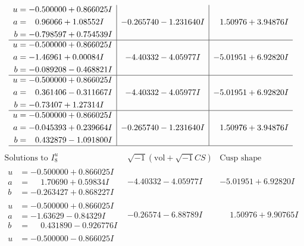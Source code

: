 \documentclass[1p]{elsarticle_modified}
\theoremstyle{definition}
\newcommand{\I}{\sqrt{-1}}
\begin{document}
$$\begin{array}{c|c|c}
\begin{aligned}
u &= -0.500000 + 0.866025 I \\
a &= \phantom{-}0.96066 + 1.08552 I \\
b &= -0.798597 + 0.754539 I\end{aligned}
 & -0.265740 - 1.231640 I & \phantom{-}1.50976 + 3.94876 I \\ \hline\begin{aligned}
u &= -0.500000 + 0.866025 I \\
a &= -1.46961 + 0.00084 I \\
b &= -0.089208 - 0.468821 I\end{aligned}
 & -4.40332 - 4.05977 I & -5.01951 + 6.92820 I \\ \hline\begin{aligned}
u &= -0.500000 + 0.866025 I \\
a &= \phantom{-}0.361406 - 0.311667 I \\
b &= -0.73407 + 1.27314 I\end{aligned}
 & -4.40332 - 4.05977 I & -5.01951 + 6.92820 I \\ \hline\begin{aligned}
u &= -0.500000 + 0.866025 I \\
a &= -0.045393 + 0.239664 I \\
b &= \phantom{-}0.432879 - 1.091800 I\end{aligned}
 & -0.265740 - 1.231640 I & \phantom{-}1.50976 + 3.94876 I\\
 \hline 
 \end{array}$$\newpage$$\begin{array}{c|c|c}  
\text{Solutions to }I^u_{8}& \I (\text{vol} + \sqrt{-1}CS) & \text{Cusp shape}\\
 \hline 
\begin{aligned}
u &= -0.500000 + 0.866025 I \\
a &= \phantom{-}1.70690 + 0.59834 I \\
b &= -0.263427 + 0.868227 I\end{aligned}
 & -4.40332 - 4.05977 I & -5.01951 + 6.92820 I \\ \hline\begin{aligned}
u &= -0.500000 + 0.866025 I \\
a &= -1.63629 - 0.84329 I \\
b &= \phantom{-}0.431890 - 0.926776 I\end{aligned}
 & -0.26574 - 6.88789 I & \phantom{-}1.50976 + 9.90765 I \\ \hline\begin{aligned}
u &= -0.500000 - 0.866025 I \\

\end{aligned}
\end{array}$$
\end{document}

